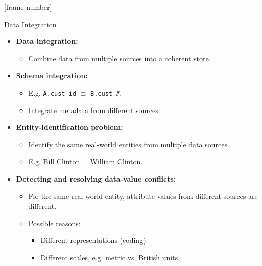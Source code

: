 \documentclass[aspectratio=169,t]{beamer}
\begin{document}
  {
    [frame number]
    \begin{frame}{Data Integration}
    \begin{itemize}
       \item \textbf{Data integration:}
       \begin{itemize}
        \item Combine data from multiple sources into a coherent store.
       \end{itemize}
       \item \textbf{Schema integration:}
       \begin{itemize}
        \item E.g. \texttt{A.cust-id} $\equiv$ \texttt{B.cust-\#}.
        \item Integrate metadata from different sources.
       \end{itemize}
       \item \textbf{Entity-identification problem:}
       \begin{itemize}
        \item Identify the same real-world entities from multiple data sources.
        \item E.g. Bill Clinton = William Clinton.
       \end{itemize}
       \item \textbf{Detecting and resolving {\color{airforceblue}data-value conflicts}:}
       \begin{itemize}
        \item For the same real world entity, attribute values from different sources are different.
        \item Possible reasons:
        \begin{itemize}
          \item Different representations (coding).
          \item Different scales, e.g. metric vs. British units.
        \end{itemize}
       \end{itemize}
    \end{itemize}
    \end{frame}
  }
\end{document}
